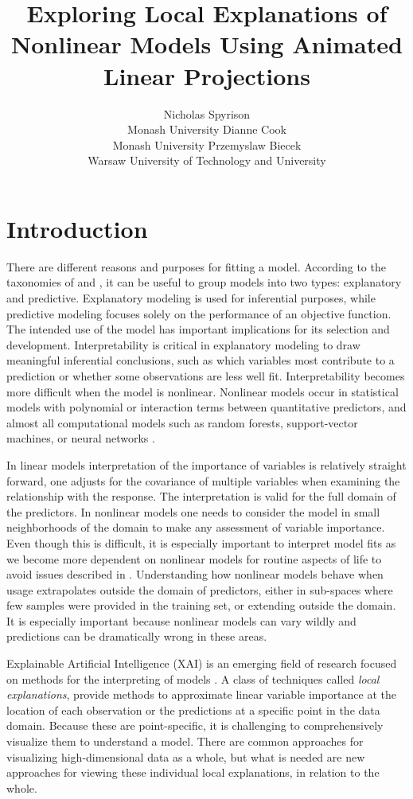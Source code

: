 \documentclass[
]{jss}
\author{
Nicholas Spyrison\\Monash University \And Dianne Cook\\Monash University \And Przemyslaw Biecek\\Warsaw University of Technology and University
}
\title{Exploring Local Explanations of Nonlinear Models Using Animated Linear Projections}
\begin{document}
\hypertarget{sec:intro}{%
\section{Introduction}\label{sec:intro}}

There are different reasons and purposes for fitting a model. According to the taxonomies of \citet{breiman_statistical_2001} and \citet{shmueli_explain_2010}, it can be useful to group models into two types: explanatory and predictive. Explanatory modeling is used for inferential purposes, while predictive modeling focuses solely on the performance of an objective function. The intended use of the model has important implications for its selection and development. Interpretability is critical in explanatory modeling to draw meaningful inferential conclusions, such as which variables most contribute to a prediction or whether some observations are less well fit. Interpretability becomes more difficult when the model is nonlinear. Nonlinear models occur in statistical models with polynomial or interaction terms between quantitative predictors, and almost all computational models such as random forests, support-vector machines, or neural networks \citep[e.g.][]{breiman_random_2001, boser_training_1992, anderson_introduction_1995}.

In linear models interpretation of the importance of variables is relatively straight forward, one adjusts for the covariance of multiple variables when examining the relationship with the response. The interpretation is valid for the full domain of the predictors. In nonlinear models one needs to consider the model in small neighborhoods of the domain to make any assessment of variable importance. Even though this is difficult, it is especially important to interpret model fits as we become more dependent on nonlinear models for routine aspects of life to avoid issues described in \citet{stahl-ethics}. Understanding how nonlinear models behave when usage extrapolates outside the domain of predictors, either in sub-spaces where few samples were provided in the training set, or extending outside the domain. It is especially important because nonlinear models can vary wildly and predictions can be dramatically wrong in these areas.

Explainable Artificial Intelligence (XAI) is an emerging field of research focused on methods for the interpreting of models \citep{adadi_peeking_2018, arrieta_explainable_2020}. A class of techniques called \emph{local explanations}, provide methods to approximate linear variable importance at the location of each observation or the predictions at a specific point in the data domain. Because these are point-specific, it is challenging to comprehensively visualize them to understand a model. There are common approaches for visualizing high-dimensional data as a whole, but what is needed are new approaches for viewing these individual local explanations, in relation to the whole.
\end{document}
